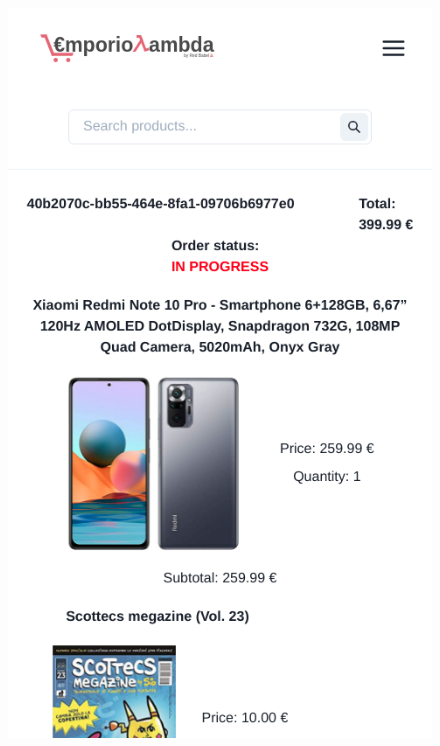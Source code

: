 \begin{itemize}
\begin{figure}[!ht]
              \vspace{10px}
              \includegraphics[scale=0.2]{../../../../Images/userManual/oderMobileDetail.png}
              \centering
          \end{figure}

\end{itemize}
